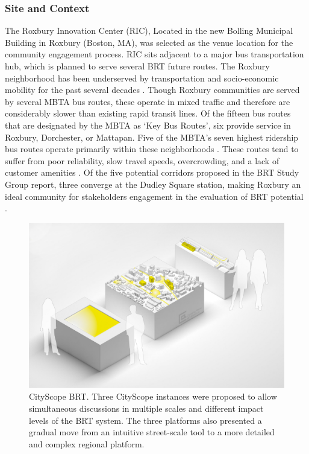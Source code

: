 {{        \subsubsection{Site and Context}
        {
            The Roxbury Innovation Center (RIC), Located in the new Bolling Municipal Building in Roxbury (Boston, MA), was selected as the venue location for the community engagement process. RIC sits adjacent to a major bus transportation hub, which is planned to serve several BRT future routes.
            The Roxbury neighborhood has been underserved by transportation and socio-economic mobility for the past several decades \cite{jennings2004urban}. Though Roxbury communities are served by several MBTA bus routes, these operate in mixed traffic and therefore are considerably slower than existing rapid transit lines. Of the fifteen bus routes that are designated by the MBTA as `Key Bus Routes', six provide service in Roxbury, Dorchester, or Mattapan. Five of the MBTA's seven highest ridership bus routes operate primarily within these neighborhoods \cite{MapsMBTA95:online}. These routes tend to suffer from poor reliability, slow travel speeds, overcrowding, and a lack of customer amenities \cite{SurveyBo15:online}. Of the five potential corridors proposed in the BRT Study Group report, three converge at the Dudley Square station, making Roxbury an ideal community for stakeholders engagement in the evaluation of BRT potential \cite{williams2015better}.
        }
    }

    \begin{figure}[!htb]
        \begin{center}
            \includegraphics[width=1\textwidth]{chapters/consensus/BRT/figures/brt0.jpeg}
        \end{center}
        \caption{CityScope BRT. Three CityScope instances were proposed to allow simultaneous discussions in multiple scales and different impact levels of the BRT system. The three platforms also presented a gradual move from an intuitive street-scale tool to a more detailed and complex regional platform.}
        \label{fig:brt_platforms}
    \end{figure}

}
